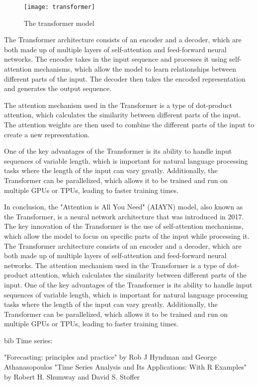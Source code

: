 \begin{figure}[H]
  \centering
  \texttt{[image: transformer]}
  \caption{The transformer model \cite{vaswani}}
\end{figure}

The Transformer architecture consists of an encoder and a decoder, which are both made up of multiple layers of self-attention and feed-forward neural networks.
The encoder takes in the input sequence and processes it using self-attention mechanisms, which allow the model to learn relationships between different parts of the input.
The decoder then takes the encoded representation and generates the output sequence.

The attention mechanism used in the Transformer is a type of dot-product attention, which calculates the similarity between different parts of the input.
The attention weights are then used to combine the different parts of the input to create a new representation.

One of the key advantages of the Transformer is its ability to handle input sequences of variable length, which is important for natural language processing tasks where the length of the input can vary greatly.
Additionally, the Transformer can be parallelized, which allows it to be trained and run on multiple GPUs or TPUs, leading to faster training times.

In conclusion, the "Attention is All You Need" (AIAYN) model, also known as the Transformer, is a neural network architecture that was introduced in 2017.
The key innovation of the Transformer is the use of self-attention mechanisms, which allow the model to focus on specific parts of the input while processing it.
The Transformer architecture consists of an encoder and a decoder, which are both made up of multiple layers of self-attention and feed-forward neural networks.
The attention mechanism used in the Transformer is a type of dot-product attention, which calculates the similarity between different parts of the input.
One of the key advantages of the Transformer is its ability to handle input sequences of variable length, which is important for natural language processing tasks where the length of the input can vary greatly. 
Additionally, the Transformer can be parallelized, which allows it to be trained and run on multiple GPUs or TPUs, leading to faster training times.

bib
Time series:

\cite{Hyndman2018} "Forecasting: principles and practice" by Rob J Hyndman and George Athanasopoulos
\cite{Shumway2017} "Time Series Analysis and Its Applications: With R Examples" by Robert H. Shumway and David S. Stoffer

